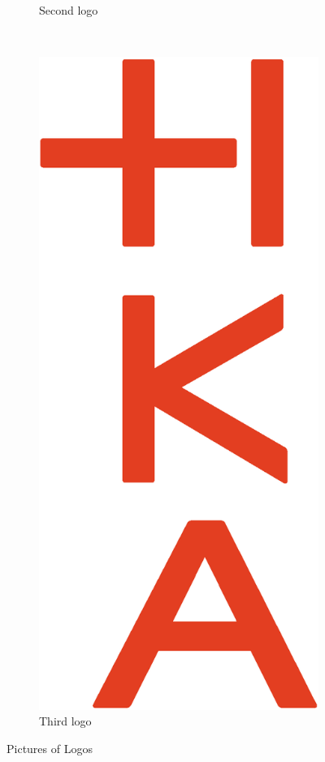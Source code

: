 \begin{figure}[H]
\begin{subfigure}[b]{0.3\textwidth}
        \caption{Second logo}
        \label{fig:logo2}
    \end{subfigure}
    ~ %
    \begin{subfigure}[b]{0.3\textwidth}
        \includegraphics[width=\textwidth]{logos/HKA_Bildmarke-v_CMYK}
        \caption{Third logo}
        \label{fig:logo3}
    \end{subfigure}
    \caption{Pictures of Logos}\label{fig:logos}
\end{figure}


